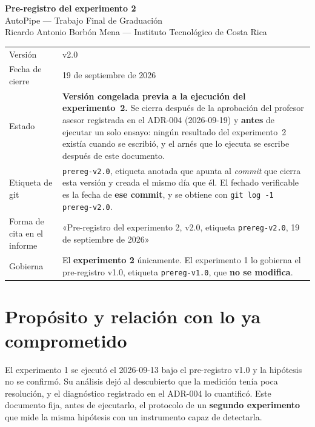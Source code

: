 \documentclass[11pt,letterpaper]{article}
\newcommand{\preregversion}{v2.0}
\newcommand{\preregtag}{prereg-v2.0}
\newcommand{\preregfecha}{19 de septiembre de 2026}
\begin{document}
\begin{center}
{\LARGE\bfseries\color{tecnavy} Pre-registro del experimento 2}\\[6pt]
{\large AutoPipe --- Trabajo Final de Graduación}\\[4pt]
{\small Ricardo Antonio Borbón Mena --- Instituto Tecnológico de Costa Rica}\\[14pt]

\begin{tabularx}{0.92\textwidth}{L{3.6cm} Y}
\toprule
{}  \\
\midrule
Versión & \preregversion \\
Fecha de cierre & \preregfecha \\
Estado & \textbf{Versión congelada previa a la ejecución del experimento~2.} Se
cierra después de la aprobación del profesor asesor registrada en el ADR-004
(2026-09-19) y \textbf{antes} de ejecutar un solo ensayo: ningún resultado del
experimento~2 existía cuando se escribió, y el arnés que lo ejecuta se escribe
después de este documento. \\
Etiqueta de git & \texttt{\preregtag}, etiqueta anotada que apunta al \emph{commit}
que cierra esta versión y creada el mismo día que él. El fechado verificable es la
fecha de \textbf{ese commit}, y se obtiene con \texttt{git log -1 \preregtag}. \\
Forma de cita en el informe & «Pre-registro del experimento 2, \preregversion,
etiqueta \texttt{\preregtag}, \preregfecha» \\
Gobierna & El \textbf{experimento 2} únicamente. El experimento 1 lo gobierna el
pre-registro v1.0, etiqueta \texttt{prereg-v1.0}, que \textbf{no se modifica}. \\
\bottomrule
\end{tabularx}
\end{center}

\vspace{10pt}

\section{Propósito y relación con lo ya comprometido}
\label{sec:proposito}

El experimento 1 se ejecutó el 2026-09-13 bajo el pre-registro v1.0 y la hipótesis
no se confirmó. Su análisis dejó al descubierto que la medición tenía poca
resolución, y el diagnóstico registrado en el ADR-004 lo cuantificó. Este documento
fija, antes de ejecutarlo, el protocolo de un \textbf{segundo experimento} que mide
la misma hipótesis con un instrumento capaz de detectarla.
\end{document}

